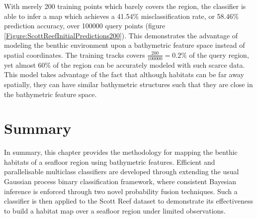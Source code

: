 		With merely 200 training points which barely covers the region, the classifier is able to infer a map which achieves a 41.54\% misclassification rate, or 58.46\% prediction accuracy, over 100000 query points (figure \ref{Figure:ScottReefInitialPredictions200}). This demonstrates the advantage of modeling the benthic environment upon a bathymetric feature space instead of spatial coordinates. The training tracks covers $\frac{200}{100000} = 0.2\%$ of the query region, yet almost 60\% of the region can be accurately modeled with such scarce data. This model takes advantage of the fact that although habitats can be far away spatially, they can have similar bathymetric structures such that they are close in the bathymetric feature space. 
												
	\section{Summary}
	\label{BenthicHabitatMapping:Summary}
	
		In summary, this chapter provides the methodology for mapping the benthic habitats of a seafloor region using bathymetric features. Efficient and parallelisable multiclass classifiers are developed through extending the usual Gaussian process binary classification framework, where consistent Bayesian inference is enforced through two novel probability fusion techniques. Such a classifier is then applied to the Scott Reef dataset to demonstrate its effectiveness to build a habitat map over a seafloor region under limited observations.
		